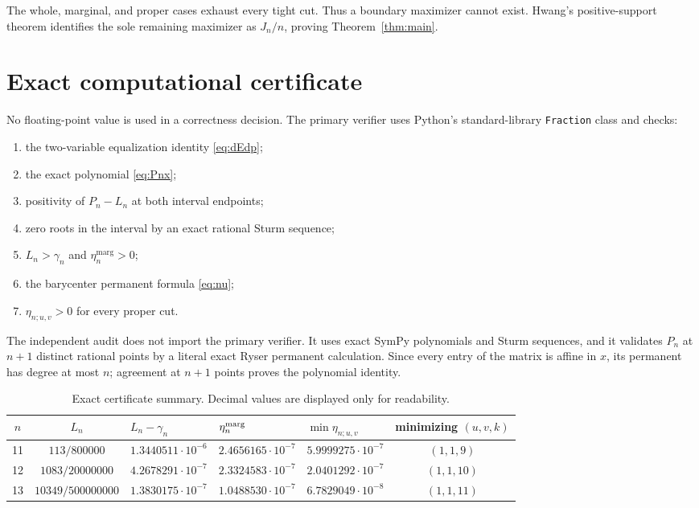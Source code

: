 \documentclass[11pt]{article}
\theoremstyle{remark}
\begin{document}
The whole, marginal, and proper cases exhaust every tight cut. Thus a boundary maximizer cannot exist. Hwang's positive-support theorem identifies the sole remaining maximizer as $J_n/n$, proving Theorem~\ref{thm:main}.

\section{Exact computational certificate}
No floating-point value is used in a correctness decision. The primary verifier uses Python's standard-library \texttt{Fraction} class and checks:
\begin{enumerate}
\item the two-variable equalization identity \eqref{eq:dEdp};
\item the exact polynomial \eqref{eq:Pnx};
\item positivity of $P_n-L_n$ at both interval endpoints;
\item zero roots in the interval by an exact rational Sturm sequence;
\item $L_n>\gamma_n$ and $\eta_n^{\mathrm{marg}}>0$;
\item the barycenter permanent formula \eqref{eq:nu};
\item $\eta_{n;u,v}>0$ for every proper cut.
\end{enumerate}

The independent audit does not import the primary verifier. It uses exact SymPy polynomials and Sturm sequences, and it validates $P_n$ at $n+1$ distinct rational points by a literal exact Ryser permanent calculation. Since every entry of the matrix is affine in $x$, its permanent has degree at most $n$; agreement at $n+1$ points proves the polynomial identity.

\begin{table}[ht]
\centering
\small
\caption{Exact certificate summary. Decimal values are displayed only for readability.}
\label{tab:cert}
\begin{tabular}{@{}cclllc@{}}
\toprule
$n$ & $L_n$ & $L_n-\gamma_n$ & $\eta_n^{\rm marg}$ & $\min\eta_{n;u,v}$ & minimizing $(u,v,k)$\\
\midrule
11 & $113/800000$ & $1.3440511\cdot10^{-6}$ & $2.4656165\cdot10^{-7}$ & $5.9999275\cdot10^{-7}$ & $(1,1,9)$\\
12 & $1083/20000000$ & $4.2678291\cdot10^{-7}$ & $2.3324583\cdot10^{-7}$ & $2.0401292\cdot10^{-7}$ & $(1,1,10)$\\
13 & $10349/500000000$ & $1.3830175\cdot10^{-7}$ & $1.0488530\cdot10^{-7}$ & $6.7829049\cdot10^{-8}$ & $(1,1,11)$\\
\bottomrule
\end{tabular}
\end{table}
\end{document}
